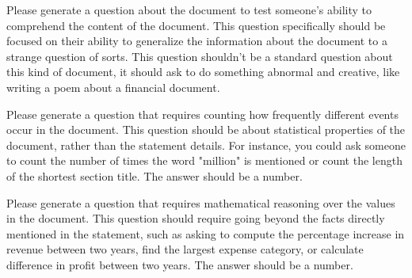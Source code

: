 \begin{examplebox}
    \small
    \ttfamily
Please generate a question about the
document to test someone's ability to comprehend the content of the document.
This question specifically should be focused on their ability to generalize the
information about the document to a strange question of sorts.
This question shouldn't be a standard question about this kind of document,
it should ask to do something abnormal and creative, like writing a poem
about a financial document.
\end{examplebox}
\begin{examplebox}
    \small
    \ttfamily
Please generate a question that requires
counting how frequently different events occur in the document.
This question should be about statistical properties of the document, rather
than the statement details. For instance, you could ask someone to count the
number of times the word "million" is mentioned or count the length of the
shortest section title.
The answer should be a number.
\end{examplebox}
\begin{examplebox}
    \small
    \ttfamily
Please generate a question that requires
mathematical reasoning over the values in the document.
This question should require going beyond the facts directly mentioned in the
statement, such as asking to compute the percentage increase in revenue between
two years, find the largest expense category, or calculate difference in profit
between two years.
The answer should be a number.
\end{examplebox}
